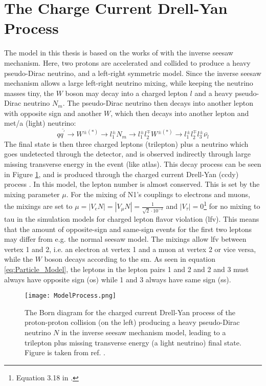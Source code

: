 \documentclass[a4paper, american, 12pt]{report}
\begin{document}
	
	\section{The Charge Current Drell-Yan Process}
	\label{sect:Theory-CCDY}
	The model in this thesis is based on the works of \citet{inverseseesaw} with the inverse seesaw mechanism. Here, two protons are accelerated and collided to produce a heavy pseudo-Dirac neutrino, and a left-right symmetric model. Since the inverse seesaw mechanism allows a large left-right neutrino mixing, while keeping the neutrino masses tiny, the $W$ boson may decay into a charged lepton $l$ and a heavy pseudo-Dirac neutrino $N_m$. The pseudo-Dirac neutrino then decays into another lepton with opposite sign and another $W$, which then decays into another lepton and \acrshort{met}/a (light) neutrino:
	\begin{equation}
	\label{eq:Particle_Model}
		q\overline{q^{'}}\rightarrow W^{\pm (*)}\rightarrow l_1^{\pm}N_m\rightarrow l_1^{\pm} l_2^{\mp} W^{\pm (*)}\rightarrow l_1^{\pm} l_2^{\mp} l_3^{\pm}\bar{\nu_l}
	\end{equation}
	The final state is then three charged leptons (trilepton) plus a neutrino which goes undetected through the detector, and is observed indirectly through large missing transverse energy in the event (like \acrshort{atlas}). This decay process can be seen in Figure \ref{fig:ModelProcess}, and is produced through the charged current Drell-Yan (\acrshort{ccdy}) process \cite{inverseseesaw}. In this model, the lepton number is almost conserved. This is set by the mixing parameter $\mu$. For the mixing of N1's couplings to electrons and muons, the mixings are set to $\mu=|V_eN|=|V_{\mu}N|=\frac{1}{\sqrt{2}\cdot 10^{-2}}$ and $|V_{\tau}|=0$\footnote{Equation 3.18 in \citet{inverseseesaw}.} for no mixing to tau in the simulation models for charged lepton flavor violation (\acrshort{lfv}). This means that the amount of opposite-sign and same-sign events for the first two leptons may differ from e.g. the normal seesaw model. The mixings allow \acrshort{lfv} between vertex 1 and 2, i.e. an electron at vertex 1 and a muon at vertex 2 or vice versa, while the $W$ boson decays according to the \acrshort{sm}. As seen in equation \ref{eq:Particle_Model}, the leptons in the lepton pairs 1 and 2 and 2 and 3 must always have opposite sign (\acrshort{os}) while 1 and 3 always have same sign (\acrshort{ss}).
	\begin{figure}[htbp!]
		\hspace*{-1.0cm}
		\centering\texttt{[image: ModelProcess.png]}
		\caption[The charged current Drell-Yan process.]{The Born diagram for the charged current Drell-Yan process of the proton-proton collision (on the left) producing a heavy pseudo-Dirac neutrino $N$ in the inverse seesaw mechanism model, leading to a trilepton plus missing transverse energy (a light neutrino) final state. Figure is taken from ref. \cite{inverseseesaw}. \label{fig:ModelProcess}}
	\end{figure} 
\end{document}
